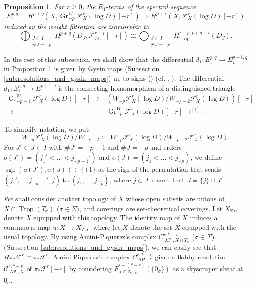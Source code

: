 \documentclass[12pt,a4]{amsart}
\newtheorem{prp}[thm]{Proposition}
\def\R{\mathbb{R}}
\def\F{\mathscr{F}}
\def\C{\mathscr{C}}
\def\AP{\mathop{\mathrm{AP}}\nolimits}
\def\sgn{\mathop{\mathrm{sgn}}\nolimits}
\def\Zar{\mathop{\mathrm{Zar}}\nolimits}
\def\Gr{\mathop{\mathrm{Gr}}\nolimits}
\def\Trop{\mathop{\mathrm{trop}}\nolimits}
\def\Trop{\mathop{\mathrm{Trop}}\nolimits}
\def\Gr{\mathop{\mathrm{Gr}}\nolimits}
\numberwithin{equation}{section}
\numberwithin{figure}{section}
\begin{document}
  \begin{prp}\label{weight spectral sequence for smooth open varieties}
    For $r \geq 0$, 
    the $E_1$-terms of the spectral sequence 
    $$E_1^{p,q}= H^{p+q} (X, \Gr^W_{-p} \F_{X}^r (\log D)[-r ])  \Rightarrow 
   H^{p+q} (X, \F^r_X (\log D)[-r])$$
      induced 
      by the weight filtration are isomorphic to
    $$ \bigoplus_{\substack{J \subset I \\ \# J= -p}}
        H^{p+q} (D_J, \F_{D_J  }^{r+p} [-r])
        \cong 
        \bigoplus_{\substack{J \subset I \\ \# J= -p}}
          H^{r+p, p+q-r }_{\Trop} ( D_J ) .$$
  \end{prp}
  
  In the rest of this subsection,
   we shall show that 
   the differential 
  $d_1 \colon E_1^{p,q} \to E_1^{p+1,q}$
   in Proposition \ref{weight spectral sequence for smooth open varieties} 
   is given by Gysin maps (Subsection \ref{sub:resolutions_and_gysin_maps}) up to signs () 
   (cf. \cite[Proposition 1.8]{GuillenNavarroSurlethormelocaldescyclesinvariantsAznar1990},   \cite[Proposition 4.7 and 4.10]{PetersSteenbrinkMixedHodgestructures2008}).
   The differential 
    $d_1 \colon E_1^{p,q} \to E_1^{p+1,q}$
   is  the connecting homomorphism of 
    a distinguished triangle
   \begin{align*}
           \Gr^W_{-p-1} \F_{X}^r (\log D) [-r]
            \to  &
          (W_{-p} \F_{X}^r (\log D)/ W_{-p-2} \F_{X}^r (\log D))
          [-r]  \\
         \to  &
          \Gr^W_{-p} \F_{X}^r (\log D) [-r] \to^{[1]}.
   \end{align*}

   To simplify notation, we put 
     $$ W_{-p} \F_{X}^r (\log D)/ W_{-p-2}
      :=
      W_{-p} \F_{X}^r (\log D)/ W_{-p-2} \F_{X}^r (\log D). 
      $$
  For $J' \subset J  \subset I$ 
     with $\# J'  =-p-1 $ and $\# J=-p$
     and orders $o(J') = ( j_1'< \dots < j_{-p-1  }' )$ 
         and $o(J)= (j_1 < \dots < j_{-p})$, 
  we define
    $\sgn (o(J'),o(J)) \in \{ \pm 1 \}$
    as 
   the sign of the permutation 
   that sends
    $ ( j_1', \dots , j_{-p-1}' , j) $ 
    to $ (j_1 , \dots , j_{-p})$,
    where $j \in J$ is such that $J= \{ j \} \cup J'$.


  We shall consider another topology of $X$
   whose 
   open subsets are unions of $X \cap \Trop (T_\sigma)$ ($ \sigma \in \Sigma$), 
   and coverings are set-theoretical coverings.
   Let $X_{\Zar}$ denote $X$ equipped with this topology.
  The identity map of $X$ induces a continuous map
   $\pi \colon X \to X_{\Zar}$, 
   where let $X$ denote the set $X$ equipped with the usual topology. 
   By using 
   Amini-Piquerez's complex
    $C^{r,*-r}_{\AP, X \cap T_{\sigma} } $ ($ \sigma \in \Sigma$) 
    (Subsection \ref{sub:resolutions_and_gysin_maps}), 
    we can easily see that 
   $R\pi_*\F^r \cong \pi_* \F^r$.
   Amini-Piquerez's complex
    $C^{r,*-r}_{\AP, X } $ gives  
   a flabby resolution 
     $\C^{r,*-r}_{\AP, X } $ of $\pi_*\F^r[-r]$ 
     by considering 
     $  F^{r-(*-r)}_{X \cap N_{\sigma, \R}} ( \{ 0_\sigma \} ) $
     as 
     a skyscraper sheaf at $0_{\sigma}$.
\end{document}

